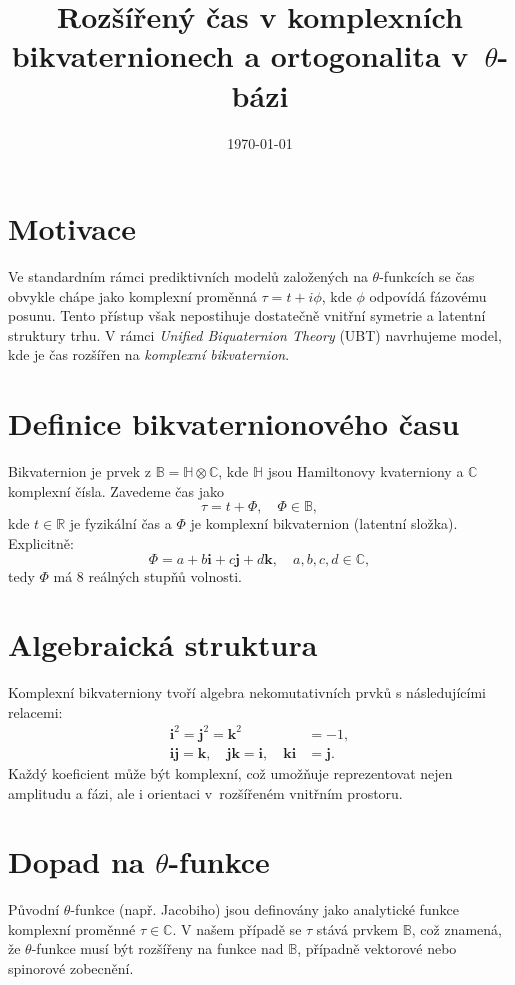 \documentclass[12pt]{article}
\title{Rozšířený čas v komplexních bikvaternionech a ortogonalita v~$\theta$-bázi}
\author{}
\date{\today}
\begin{document}
\maketitle

\section{Motivace}
Ve standardním rámci prediktivních modelů založených na $\theta$-funkcích se čas obvykle chápe jako komplexní proměnná $\tau = t + i\phi$, kde $\phi$ odpovídá fázovému posunu. Tento přístup však nepostihuje dostatečně vnitřní symetrie a latentní struktury trhu. V rámci \emph{Unified Biquaternion Theory} (UBT) navrhujeme model, kde je čas rozšířen na \emph{komplexní bikvaternion}.

\section{Definice bikvaternionového času}
Bikvaternion je prvek z $\mathbb{B} = \mathbb{H} \otimes \mathbb{C}$, kde $\mathbb{H}$ jsou Hamiltonovy kvaterniony a $\mathbb{C}$ komplexní čísla. Zavedeme čas jako
\begin{equation}
\tau = t + \Phi, \quad \Phi \in \mathbb{B},
\end{equation}
kde $t \in \mathbb{R}$ je fyzikální čas a $\Phi$ je komplexní bikvaternion (latentní složka). Explicitně:
\begin{equation}
\Phi = a + b\mathbf{i} + c\mathbf{j} + d\mathbf{k}, \quad a,b,c,d \in \mathbb{C},
\end{equation}
tedy $\Phi$ má 8 reálných stupňů volnosti.

\section{Algebraická struktura}
Komplexní bikvaterniony tvoří algebra nekomutativních prvků s následujícími relacemi:
\begin{align*}
\mathbf{i}^2 = \mathbf{j}^2 = \mathbf{k}^2 &= -1,\\
\mathbf{i}\mathbf{j} = \mathbf{k},\quad \mathbf{j}\mathbf{k} = \mathbf{i},\quad \mathbf{k}\mathbf{i} &= \mathbf{j}.
\end{align*}
Každý koeficient může být komplexní, což umožňuje reprezentovat nejen amplitudu a fázi, ale i orientaci v~rozšířeném vnitřním prostoru.

\section{Dopad na $\theta$-funkce}
Původní $\theta$-funkce (např. Jacobiho) jsou definovány jako analytické funkce komplexní proměnné $\tau \in \mathbb{C}$. V našem případě se $\tau$ stává prvkem $\mathbb{B}$, což znamená, že $\theta$-funkce musí být rozšířeny na funkce nad $\mathbb{B}$, případně vektorové nebo spinorové zobecnění.
\end{document}
